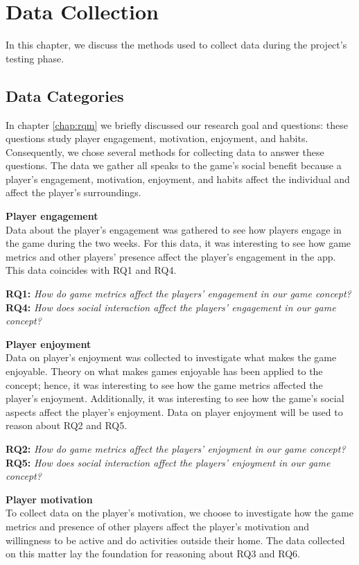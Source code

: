 \section{Data Collection}
\label{chap:data_collection}
In this chapter, we discuss the methods used to collect data during the project’s testing phase.

\subsection{Data Categories}

In chapter \ref{chap:rqm} we briefly discussed our research goal and questions: these questions study player engagement, motivation, enjoyment, and habits. Consequently, we chose several methods for collecting data to answer these questions. The data we gather all speaks to the game’s social benefit because a player’s engagement, motivation, enjoyment, and habits affect the individual and affect the player’s surroundings.

\textbf{Player engagement}\\
Data about the player’s engagement was gathered to see how players engage in the game during the two weeks. For this data, it was interesting to see how game metrics and other players’ presence affect the player’s engagement in the app. This data coincides with RQ1 and RQ4.

\textbf{RQ1:} \textit{How do game metrics affect the players’ engagement in our game concept?}
\textbf{RQ4:} \textit{How does social interaction affect the players’ engagement in our game concept?}

\textbf{Player enjoyment}\\
Data on player’s enjoyment was collected to investigate what makes the game enjoyable. Theory on what makes games enjoyable has been applied to the concept; hence, it was interesting to see how the game metrics affected the player’s enjoyment. Additionally, it was interesting to see how the game’s social aspects affect the player’s enjoyment. Data on player enjoyment will be used to reason about RQ2 and RQ5. 

\textbf{RQ2:} \textit{How do game metrics affect the players’ enjoyment in our game concept?}
\textbf{RQ5:} \textit{How does social interaction affect the players’ enjoyment in our game concept?}

\textbf{Player motivation}\\
To collect data on the player’s motivation, we choose to investigate how the game metrics and presence of other players affect the player’s motivation and willingness to be active and do activities outside their home. The data collected on this matter lay the foundation for reasoning about RQ3 and RQ6.

